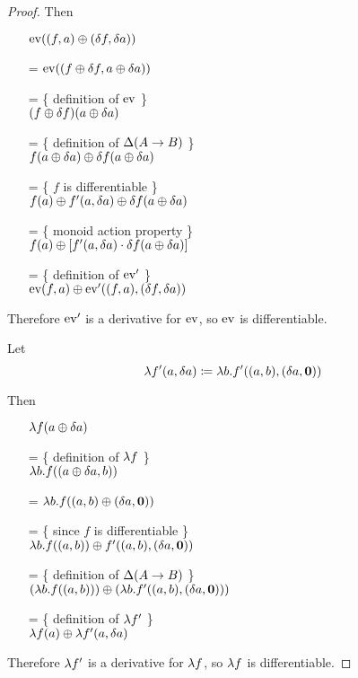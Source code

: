 \begin{proof}
  Then
  \begin{itemize}
    \item[ ]$\operatorname{ev}((f, a) \oplus (\delta f, \delta a))$
    \item[=]$\operatorname{ev}((f \oplus \delta f, a \oplus \delta a))$
    \item[=]\{ definition of $\operatorname{ev}$ \}\\
      $(f \oplus \delta f)(a \oplus \delta a)$
    \item[=]\{ definition of $\Delta (A \rightarrow B)$ \}\\
      $f(a \oplus \delta a) \oplus \delta f(a \oplus \delta a)$
    \item[=]\{ $f$ is differentiable \}\\
      $f(a) \oplus f'(a, \delta a) \oplus \delta f(a \oplus \delta a)$
    \item[=]\{ monoid action property \}\\
      $f(a) \oplus \left[ f'(a, \delta a) \cdot \delta f(a \oplus \delta a)\right]$
    \item[=]\{ definition of $\operatorname{ev}'$ \}\\
      $\operatorname{ev}(f, a) \oplus \operatorname{ev}'((f, a), (\delta f, \delta a))$
  \end{itemize}
  Therefore $\operatorname{ev}'$ is a derivative for $\operatorname{ev}$, so $\operatorname{ev}$ is differentiable.
  
  Let
  $$\lambda f'(a, \delta a) \coloneqq \lambda b. f'((a, b),
  (\delta a, \textbf{0}))$$
  
  Then
  \begin{itemize}
    \item[ ]$\lambda f(a \oplus \delta a)$
    \item[=]\{ definition of $\lambda f$ \}\\
      $\lambda b. f((a \oplus \delta a, b))$
    \item[=] $\lambda b. f((a, b) \oplus (\delta a, \textbf{0}))$
    \item[=]\{ since $f$ is differentiable \}\\
      $\lambda b. f((a, b)) \oplus f'((a, b), (\delta a, \textbf{0}))$
    \item[=]\{ definition of $\Delta (A \rightarrow B)$ \}\\
      $(\lambda b. f((a, b))) \oplus (\lambda b. f'((a, b), (\delta a, \textbf{0})))$
    \item[=]\{ definition of $\lambda f'$ \}\\
      $\lambda f(a) \oplus \lambda f'(a, \delta a)$
  \end{itemize}

  Therefore $\lambda f'$ is a derivative for $\lambda f$, so $\lambda f$
  is differentiable.
\end{proof}
\fi

